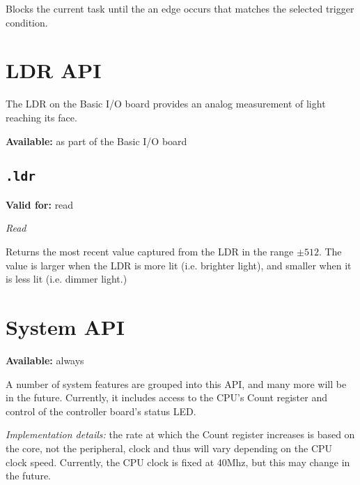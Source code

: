 \documentclass{article}
\begin{document}
Blocks the current task until the an edge occurs that matches the selected trigger condition.

\section{LDR API}

The LDR on the Basic I/O board provides an analog measurement of light reaching its face.

\textbf{Available:} as part of the Basic I/O board

\subsection{\texttt{.ldr}}
\textbf{Valid for:} read

\textit{Read}

Returns the most recent value captured from the LDR in the range $\pm512$. The value is larger when the LDR is more lit (i.e. brighter light), and smaller when it is less lit (i.e. dimmer light.)

%
%
%
\section{System API}
\textbf{Available:} always

A number of system features are grouped into this API, and many more will be in the future. Currently, it includes access to the CPU's Count register and control of the controller board's status LED.

\textit{Implementation details:} the rate at which the Count register increases is based on the core, not the peripheral, clock and thus will vary depending on the CPU clock speed.
Currently, the CPU clock is fixed at 40Mhz, but this may change in the future.
\end{document}
